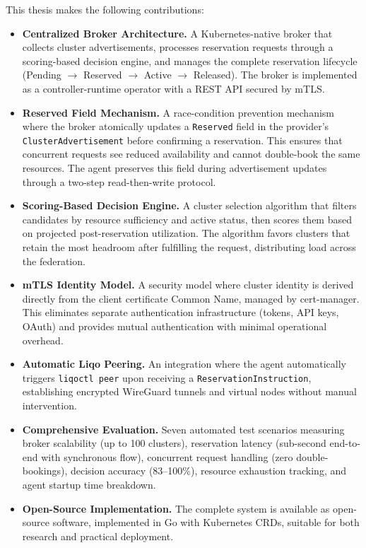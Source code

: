 This thesis makes the following contributions:

\begin{itemize}
    \item \textbf{Centralized Broker Architecture.} A Kubernetes-native broker that collects cluster advertisements, processes reservation requests through a scoring-based decision engine, and manages the complete reservation lifecycle (Pending $\to$ Reserved $\to$ Active $\to$ Released). The broker is implemented as a controller-runtime operator with a REST API secured by mTLS.

    \item \textbf{Reserved Field Mechanism.} A race-condition prevention mechanism where the broker atomically updates a \texttt{Reserved} field in the provider's \texttt{ClusterAdvertisement} before confirming a reservation. This ensures that concurrent requests see reduced availability and cannot double-book the same resources. The agent preserves this field during advertisement updates through a two-step read-then-write protocol.

    \item \textbf{Scoring-Based Decision Engine.} A cluster selection algorithm that filters candidates by resource sufficiency and active status, then scores them based on projected post-reservation utilization. The algorithm favors clusters that retain the most headroom after fulfilling the request, distributing load across the federation.

    \item \textbf{mTLS Identity Model.} A security model where cluster identity is derived directly from the client certificate Common Name, managed by cert-manager. This eliminates separate authentication infrastructure (tokens, API keys, OAuth) and provides mutual authentication with minimal operational overhead.

    \item \textbf{Automatic Liqo Peering.} An integration where the agent automatically triggers \texttt{liqoctl peer} upon receiving a \texttt{ReservationInstruction}, establishing encrypted WireGuard tunnels and virtual nodes without manual intervention.

    \item \textbf{Comprehensive Evaluation.} Seven automated test scenarios measuring broker scalability (up to 100 clusters), reservation latency (sub-second end-to-end with synchronous flow), concurrent request handling (zero double-bookings), decision accuracy (83--100\%), resource exhaustion tracking, and agent startup time breakdown.

    \item \textbf{Open-Source Implementation.} The complete system is available as open-source software, implemented in Go with Kubernetes CRDs, suitable for both research and practical deployment.
\end{itemize}


